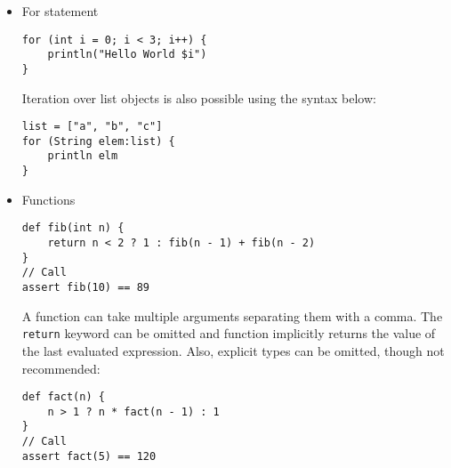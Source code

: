 \documentclass[letterpaper,11pt]{article}
\begin{document}
\begin{itemize}
\item For statement
\begin{verbatim}
for (int i = 0; i < 3; i++) {
    println("Hello World $i")
} 
\end{verbatim}
Iteration over list objects is also possible using the syntax below:
\begin{verbatim}
list = ["a", "b", "c"]
for (String elem:list) {
    println elm
}
\end{verbatim}

\item Functions
\begin{verbatim}
def fib(int n) {
    return n < 2 ? 1 : fib(n - 1) + fib(n - 2)
}
// Call
assert fib(10) == 89
\end{verbatim}
A function can take multiple arguments separating them with a comma. The \texttt{return} keyword can be omitted and function implicitly returns the value of the last evaluated expression. Also, explicit types can be omitted, though not recommended:
\begin{verbatim}
def fact(n) {
    n > 1 ? n * fact(n - 1) : 1
}
// Call
assert fact(5) == 120
\end{verbatim}


\end{itemize}
\end{document}
